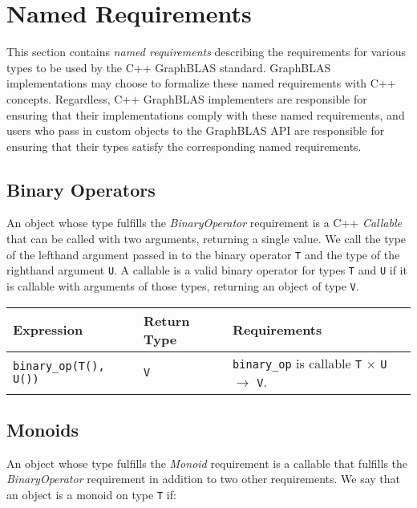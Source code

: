 \chapter{Named Requirements}
\label{Chp:NamedRequirements}

This section contains \textit{named requirements} describing the requirements for
various types to be used by the C++ GraphBLAS standard.
GraphBLAS implementations may choose to formalize these named requirements with
C++ concepts.  Regardless, C++ GraphBLAS implementers are responsible for
ensuring that their implementations comply with these named requirements, and
users who pass in custom objects to the GraphBLAS API are responsible for
ensuring that their types satisfy the corresponding named requirements.

\section{Binary Operators}
An object whose type fulfills the \textit{BinaryOperator} requirement is a C++
\textit{Callable} that can be called with two arguments, returning a single
value.  We call the type of the lefthand argument passed in to the binary operator
\texttt{T} and the type of the righthand argument \texttt{U}.  A callable is a
valid binary operator for types \texttt{T} and \texttt{U} if it is callable with
arguments of those types, returning an object of type \texttt{V}.

\begin{tabularx}{\textwidth}{l l X}
\textbf{Expression} & \textbf{Return Type} & \textbf{Requirements}\\
\hline
\texttt{binary\_op(T(), U())} & \texttt{V} & \texttt{binary\_op} is callable \texttt{T} $\times$ \texttt{U} $\rightarrow$ \texttt{V}.\\
\end{tabularx}

\section{Monoids}
An object whose type fulfills the \textit{Monoid} requirement is a callable that
fulfills the \textit{BinaryOperator} requirement in addition to two other requirements.
We say that an object is a monoid on type \texttt{T} if:


